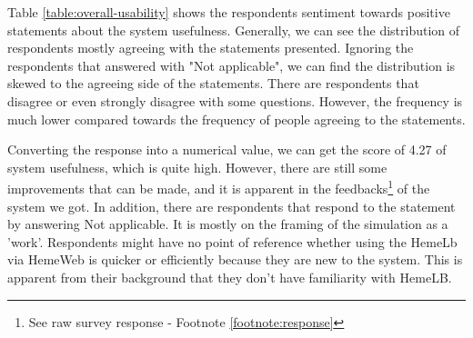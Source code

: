 Table \ref{table:overall-usability} shows the respondents sentiment towards positive statements about the system usefulness. Generally, we can see the distribution of respondents mostly agreeing with the statements presented. Ignoring the respondents that answered with "Not applicable", we can find the distribution is skewed to the agreeing side of the statements. There are respondents that disagree or even strongly disagree with some questions. However, the frequency is much lower compared towards the frequency of people agreeing to the statements. 

Converting  the response into a numerical value, we can get the score of 4.27 of system usefulness, which is quite high. However, there are still some improvements that can be made, and it is apparent in the feedbacks\footnote{See raw survey response - Footnote \ref{footnote:response}} of the system we got. In addition, there are respondents that respond to the statement by answering Not applicable. It is mostly on the framing of the simulation as a 'work'. Respondents might have no point of reference whether using the HemeLb via HemeWeb is quicker or efficiently because they are new to the system. This is apparent from their background that they don't  have familiarity with HemeLB.



